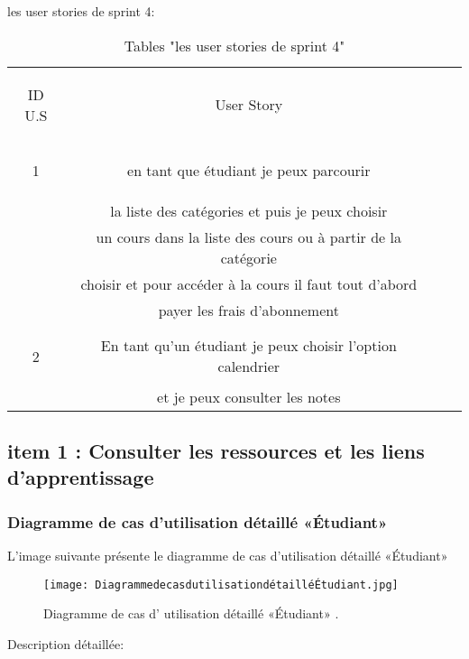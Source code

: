 \begin{table}[h]
	
	 
	
	{\Large \color{cyan} les user stories de sprint 4:}
	
	\begin{center}
		\begin{tabular}{>{\begin{bf} } c <{\end{bf}}ccc}
			
			\rowcolor{-blue!20!red}ID U.S & \begin{bf}User Story \end{bf}  & \\
			
			1 &en tant que étudiant je peux parcourir \\
			&la liste  des catégories et puis je peux choisir \\
			&un cours dans la liste des cours ou à partir de la catégorie\\
			& choisir et pour accéder à la cours il faut tout d'abord\\
			& payer les frais d'abonnement
			\\
			& \\
			2 & En tant qu'un étudiant je peux choisir l'option
			calendrier \\ & et je peux consulter les notes	\\
		
			
		\end{tabular}
	\end{center}
	\caption{Tables  "les user stories de sprint 4"}
	\label{les user stories de sprint 4}
\end{table}



\clearpage
\clearpage
\subsection{item 1 : Consulter les ressources et les liens d'apprentissage}
\subsubsection{Diagramme de cas d’utilisation  détaillé «Étudiant» }
L’image suivante présente le diagramme de cas d’utilisation détaillé «Étudiant»
\begin{figure}[ht]
	\centering
	\texttt{[image: DiagrammedecasdutilisationdétailléÉtudiant.jpg]}
	\caption{Diagramme de cas d' utilisation  détaillé «Étudiant» .}
	\label{fig:Diagramme de cas d' utilisation  détaillé Étudiant  }
\end{figure}
\FloatBarrier
{\Large \color{cyan} Description détaillée:}

